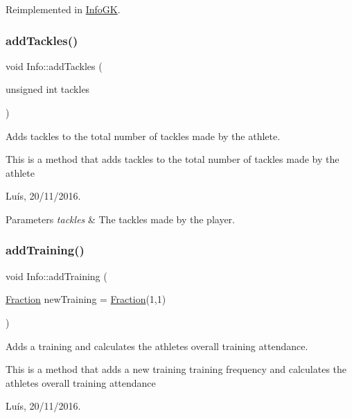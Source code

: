 Reimplemented in \hyperlink{class_info_g_k_aa1535598fa29b199374a404dda8b73f2}{Info\+GK}.

\hypertarget{class_info_a7d57f15ce5bf8b0b069d6f11c2238f36}{}\label{class_info_a7d57f15ce5bf8b0b069d6f11c2238f36} 
\subsubsection{\texorpdfstring{add\+Tackles()}{addTackles()}}
{\footnotesize\ttfamily void Info\+::add\+Tackles (\begin{DoxyParamCaption}\item[{unsigned int}]{tackles }\end{DoxyParamCaption})}



Adds tackles to the total number of tackles made by the athlete. 

This is a method that adds tackles to the total number of tackles made by the athlete

Luís, 20/11/2016. 


\begin{DoxyParams}{Parameters}
{\em tackles} & The tackles made by the player. \\
\hline
\end{DoxyParams}
\hypertarget{class_info_acbd13c7c7b330089ab211158a5bc6c13}{}\label{class_info_acbd13c7c7b330089ab211158a5bc6c13} 
\subsubsection{\texorpdfstring{add\+Training()}{addTraining()}}
{\footnotesize\ttfamily void Info\+::add\+Training (\begin{DoxyParamCaption}\item[{\hyperlink{class_fraction}{Fraction}}]{new\+Training = {\ttfamily \hyperlink{class_fraction}{Fraction}(1,1)} }\end{DoxyParamCaption})}



Adds a training and calculates the athlete\textquotesingle{}s overall training attendance. 

This is a method that adds a new training training frequency and calculates the athlete\textquotesingle{}s overall training attendance

Luís, 20/11/2016. 


